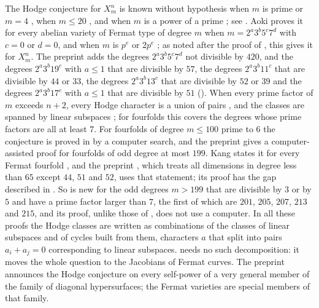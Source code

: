 \begin{remark}\label{rem:fermatknown}
The Hodge conjecture for $X^{n}_{m}$ is known without hypothesis when $m$ is
prime or $m=4$ \cite{Ran80,Shi79}, when $m\le20$ \cite{Shi79}, and when $m$
is a power of a prime \cite[Corollary~2-3]{Aok87}; see \cite[\S2]{daS21}.
Aoki proves it for every abelian variety of Fermat type of degree $m$ when
$m=2^{a}3^{b}5^{c}7^{d}$ with $c=0$ or $d=0$, and when $m$ is $p^{e}$ or
$2p^{e}$ \cite[Theorem~0.1]{Aok00}; as noted after the proof of
, this gives it for $X^{n}_{m}$. The preprint \cite{Pet26} adds
the degrees $2^{a}3^{b}5^{c}7^{d}$ not divisible by $420$, and
 the degrees $2^{a}3^{b}19^{c}$ with $a\le1$ that are
divisible by $57$, the degrees $2^{a}3^{b}11^{c}$ that are divisible by $44$
or $33$, the degrees $2^{a}3^{b}13^{c}$ that are divisible by $52$ or $39$
and the degrees $2^{a}3^{b}17^{c}$ with $a\le1$ that are divisible by $51$
(). When every prime
factor of $m$ exceeds $n+2$, every Hodge character is a union of pairs
\cite[Theorem~A]{Aok83}, and the classes are spanned by linear subspaces
\cite{Ran80,Shi79}; for fourfolds this covers the degrees whose prime factors
are all at least $7$. For fourfolds of degree $m\le100$ prime to $6$ the
conjecture is proved in \cite[Proposition~3.1]{daS21} by a computer search,
and the preprint \cite{Jum26} gives a computer-assisted proof for fourfolds
of odd degree at most $199$. Kang states it for every Fermat fourfold
\cite[Corollary~3.2]{Kan16}, and the preprint \cite{MMRV26}, which treats all
dimensions in degree less than $65$ except $44$, $51$ and $52$, uses that
statement; its proof has the gap described in . So
 is new for the odd degrees $m>199$ that are divisible by $3$ or
by $5$ and have a prime factor larger than $7$, the first of which are $201$,
$205$, $207$, $213$ and $215$, and its proof, unlike those of
\cite{daS21,Jum26}, does not use a computer.
In all these proofs the Hodge classes are written as combinations of the
classes of linear subspaces and of cycles built from them, characters $a$
that split into pairs $a_{i}+a_{j}=0$ corresponding to linear subspaces.
 needs no such decomposition: it moves the whole question to the
Jacobians of Fermat curves. The preprint \cite{OAI26b} announces the Hodge
conjecture on every self-power of a very general member of the family of
diagonal hypersurfaces; the Fermat varieties are special members of that
family.
\end{remark}
